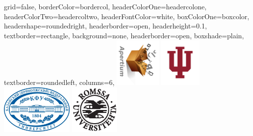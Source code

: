 \documentclass[fontscale=0.3,landscape,paperwidth=72in,paperheight=36in]{baposter}  %
\begin{document}
	\begin{poster}{
			grid=false,
			borderColor=bordercol,
			headerColorOne=headercolone,
			headerColorTwo=headercoltwo,
			headerFontColor=white,
			boxColorOne=boxcolor,
			headershape=roundedright,
  headerborder=open,
  headerheight=0.1\textheight,
			textborder=rectangle,
			background=none,
			headerborder=open,
			boxshade=plain,
			textborder=roundedleft,
			columns=6,
		}{
			\includegraphics[angle=90,height=6.5em]{apertium5b}%
				\hspace{1cm}\includegraphics[height=6.5em]{iu_tab}
				\hspace{1cm}\includegraphics[height=6.5em]{kfu}
				\hspace{1cm}\includegraphics[height=6.5em]{uitlogo}
}
\end{poster}
\end{document}
